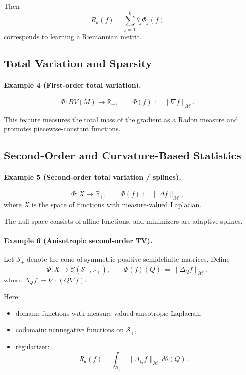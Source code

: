 Then
\[
	R_\theta(f) = \sum_{j=1}^k \theta_j \Phi_j(f)
\]
corresponds to learning a Riemannian metric.


\subsection{Total Variation and Sparsity}

\paragraph{Example 4 (First-order total variation).}
\[
	\Phi : BV(M) \to \mathbb{R}_+,
	\qquad
	\Phi(f) := \|\nabla f\|_{\mathcal M}.
\]

This feature measures the total mass of the gradient as a Radon measure and promotes piecewise-constant functions.


\subsection{Second-Order and Curvature-Based Statistics}\label{par:anisotropic-second-order-tv}

\paragraph{Example 5 (Second-order total variation / splines).}
\[
	\Phi : X \to \mathbb{R}_+,
	\qquad
	\Phi(f) := \|\Delta f\|_{\mathcal M},
\]
where $X$ is the space of functions with measure-valued Laplacian.

The null space consists of affine functions, and minimizers are adaptive splines.


\paragraph{Example 6 (Anisotropic second-order TV).}
Let $\mathcal S_+$ denote the cone of symmetric positive semidefinite matrices.
Define
\[
	\Phi : X \to \mathcal C(\mathcal S_+,\mathbb{R}_+),
	\qquad
	\Phi(f)(Q) := \|\Delta_Q f\|_{\mathcal M},
\]
where $\Delta_Q f := \nabla\cdot(Q\nabla f)$.

Here:
\begin{itemize}
	\item domain: functions with measure-valued anisotropic Laplacian,
	\item codomain: nonnegative functions on $\mathcal S_+$,
	\item regularizer:
	      \[
		      R_\theta(f) = \int_{\mathcal S_+} \|\Delta_Q f\|_{\mathcal M}\, d\theta(Q).
	      \]
\end{itemize}

